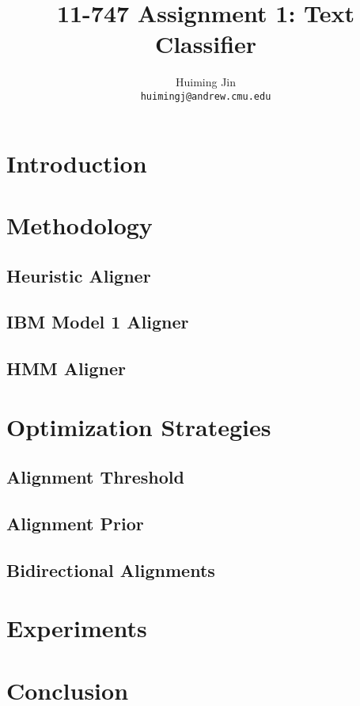 \documentclass[11pt,letterpaper]{article}
\title{11-747 Assignment 1: Text Classifier}
\author{Huiming Jin \\ \texttt{huimingj@andrew.cmu.edu}}
\date{}
\begin{document}
\maketitle 
\begin{abstract}

\end{abstract}

\section{Introduction}


\section{Methodology}

\subsection{Heuristic Aligner}

\subsection{IBM Model 1 Aligner}

\subsection{HMM Aligner}

\section{Optimization Strategies}

\subsection{Alignment Threshold}

\subsection{Alignment Prior}

\subsection{Bidirectional Alignments}

\section{Experiments}

\section{Conclusion}

\vspace{1em} 
%
%
%

 
\appendix
\end{document}
